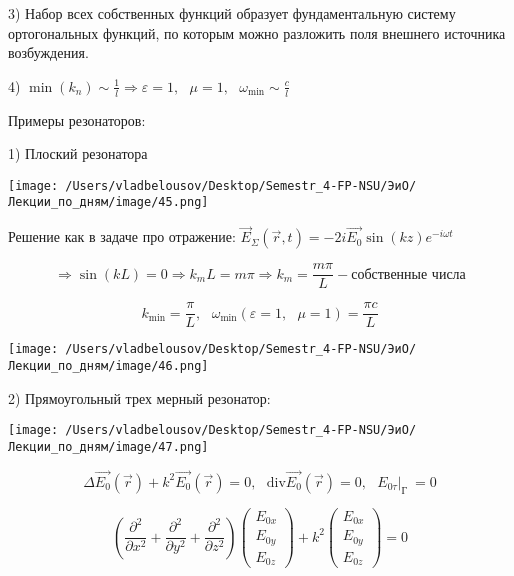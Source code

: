 \documentclass[12pt, a4paper]{report}
\begin{document}
3) Набор всех собственных  функций образует фундаментальную систему ортогональных функций, по которым можно разложить поля внешнего источника возбуждения. 

4) \(\displaystyle  \min (k_n ) \sim \frac{1}{l}  \Rightarrow \varepsilon = 1, \text{ }  \mu =1 , \text{ }\omega _{\min  } \sim \frac{c}{l}     \) 

Примеры резонаторов: 

1) Плоский резонатора

\begin{center}
    \texttt{[image: /Users/vladbelousov/Desktop/Semestr\_4-FP-NSU/ЭиО/Лекции\_по\_дням/image/45.png]}
\end{center}

Решение как в задаче про отражение: \( \displaystyle  \vec{E } _{\Sigma} ( \vec{r } , t ) = -2 i \vec{E_0} \sin (kz ) e^{ - i \omega t }  \) 

\[ \Rightarrow \sin (kL ) = 0 \Rightarrow k_m L = m \pi \Rightarrow k_m = \frac{m \pi }{L}   - \text{собственные числа}  \] 

\[ k_{\min  } = \frac{\pi}{ L }  , \text{ } \omega_{ \min } (\varepsilon = 1, \text{ }  \mu =1 )  = \frac{ \pi c }{L}   \] 

\begin{center}
    \texttt{[image: /Users/vladbelousov/Desktop/Semestr\_4-FP-NSU/ЭиО/Лекции\_по\_дням/image/46.png]}
\end{center}

2) Прямоугольный трех мерный резонатор: 

\begin{center}
    \texttt{[image: /Users/vladbelousov/Desktop/Semestr\_4-FP-NSU/ЭиО/Лекции\_по\_дням/image/47.png]}
\end{center}

\[ \Delta \vec{E_0 }(\vec{r } )  + k ^2 \vec{E_0 }(\vec{r } ) = 0 , \text{ }  \mathrm{div } \vec{E_0 }(\vec{r } ) = 0 , \text{ } E_{0 \tau} |_{\text{Г } }  = 0   \] 

\[ \left( \frac{\partial  ^2 }{\partial  x ^2 } + \frac{\partial  ^2 }{ \partial  y ^2 } + \frac{\partial  ^2 }{\partial  z ^2 }    \right) \begin{pmatrix}
    E_{0x}\\
    E_{0y} \\
    E_{0z} 
    \end{pmatrix} + k ^2 \begin{pmatrix}
        E_{0x}\\
        E_{0y} \\
        E_{0z} 
    \end{pmatrix} = 0\] 
\end{document}
